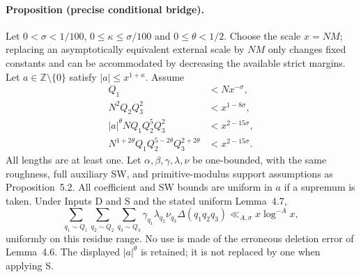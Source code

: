 \paragraph{Proposition (precise conditional bridge).}
Let $0<\sigma<1/100$, $0\le\kappa\le\sigma/100$ and
$0\le\theta<1/2$. Choose the scale $x=NM$; replacing an asymptotically
equivalent external scale by $NM$ only changes fixed constants and
can be accommodated by decreasing the available strict margins.
Let $a\in\mathbb Z\setminus\{0\}$ satisfy $|a|\le x^{1+\kappa}$.
Assume
\begin{align}
 Q_1&<Nx^{-\sigma},                                      \tag{B1}\\
 N^2Q_2Q_3^2&<x^{1-8\sigma},                              \tag{B2}\\
 |a|^\theta NQ_1Q_2^5Q_3^2&<x^{2-15\sigma},               \tag{B3}\\
 N^{1+2\theta}Q_1Q_2^{5-2\theta}Q_3^{2+2\theta}
   &<x^{2-15\sigma}.                                    \tag{B4}
\end{align}
All lengths are at least one. Let $\alpha,\beta,\gamma,\lambda,\nu$
be one-bounded, with the same roughness, full auxiliary SW, and
primitive-modulus support assumptions as Proposition~5.2. All
coefficient and SW bounds are uniform in $a$ if a supremum is taken.
Under Inputs D and S and the stated uniform Lemma~4.7,
\[
 \sum_{q_1\sim Q_1}\sum_{q_2\sim Q_2}\sum_{q_3\sim Q_3}
 \gamma_{q_1}\lambda_{q_2}\nu_{q_3}\Delta(q_1q_2q_3)
 \ll_{A,\sigma} x\log^{-A}x,                             \tag{B5}
\]
uniformly on this residue range. No use is made of the erroneous
deletion error of Lemma~4.6. The displayed $|a|^\theta$ is retained;
it is not replaced by one when applying S.

